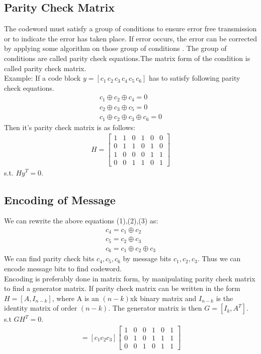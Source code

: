 \subsection{Parity Check Matrix}

The codeword must satisfy a group of conditions to ensure error free transmission or to indicate the error has taken place. If error occurs, the error can be corrected by applying some algorithm on those group of conditions . The group of conditions are called parity check equations.The matrix form of the condition is called parity check matrix. \\
Example: If a code block $y=[c_1\, c_2\,c_3\, c_4\, c_5\, c_6]$ has to satisfy following parity check equations. 
\begin{align}
c_1 \oplus c_2 \oplus c_4 =0 \\
 c_2 \oplus c_3 \oplus c_5 =0 \\
c_1 \oplus c_2 \oplus c_3 \oplus c_6 =0 
\end{align}  
Then it's parity check matrix is as follows:
\begin{align}
 H= \left[ \begin{array}{cccccc}
1 & 1 & 0 & 1 & 0 & 0\\
0 & 1 & 1 & 0 & 1 & 0\\
1 & 0 & 0 & 0 & 1 & 1\\
0 & 0 & 1 & 1 & 0 & 1  
\end{array} \right]  
\end{align} 
s.t. $Hy^T=0$.

\subsection{Encoding of Message}
We can rewrite the above equations (1),(2),(3) as:
\begin{align}
c_4 = c_1 \oplus c_2 \\
c_5 = c_2 \oplus c_3 \\
c_6 = c_1 \oplus c_2 \oplus c_3  
\end{align}  
We can find parity check bits $c_4,c_5,c_6$ by message bits $c_1,c_2,c_3$.
Thus we can encode message bits to find codeword. \\
Encoding is preferably done in matrix form, by manipulating parity check matrix to find a generator matrix.
If parity check matrix can be written in the form
$H = [A, I_{n- k} ]$,
where A is an $(n-k)$xk binary matrix and $I_{n-k}$ is the identity matrix of order
$(n-k)$. The generator matrix is then
$G = [I_k , A^T ]$.
s.t $GH^T = 0$. \\
\begin{align}
[c_1 c_2 ... c_6]=[c_1 c_2 c_3] \left[ \begin{array}{cccccc}
1 & 0 & 0 & 1 & 0 & 1\\
0 & 1 & 0 & 1 & 1 & 1\\
0 & 0 & 1 & 0 & 1 & 1  
\end{array} \right]
\end{align}
 

